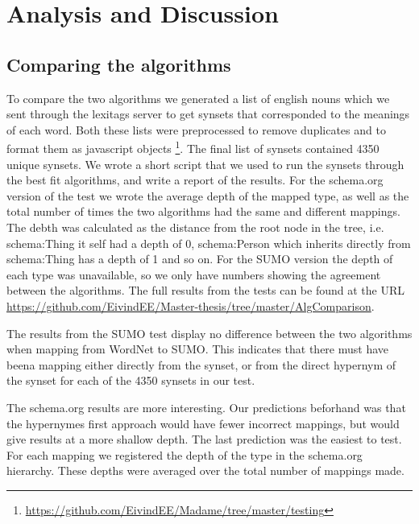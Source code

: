 
\chapter{Analysis and Discussion} %

\label{AnalysisAndDiscussion}


\section{Comparing the algorithms}
\label{ComparingAlgorithms}
To compare the two algorithms we generated a list of english nouns
which we sent through the lexitags server to get synsets that corresponded to the meanings of each word.
Both these lists were preprocessed to remove duplicates and to format them as javascript objects
\footnote{\url{https://github.com/EivindEE/Madame/tree/master/testing}}.
The final list of synsets contained 4350 unique synsets.
We wrote a short script that we used to run the synsets through the best fit algorithms,
and write a report of the results.
For the schema.org version of the test we wrote the average depth of the mapped type,
as well as the total number of times the two algorithms had the same and different mappings.
The debth was calculated as the distance from the root node in the tree,
i.e. schema:Thing it self had a depth of 0,
schema:Person which inherits directly from schema:Thing has a depth of 1 and so on.
For the SUMO version the depth of each type was unavailable,
so we only have numbers showing the agreement between the algorithms.
The full results from the tests can be found at the URL \url{https://github.com/EivindEE/Master-thesis/tree/master/AlgComparison}.

The results from the SUMO test display no difference between the two algorithms when mapping from WordNet to SUMO.
This indicates that there must have beena mapping either directly from the synset,
or from the direct hypernym of the synset for each of the 4350 synsets in our test.

The schema.org results are more interesting.
Our predictions beforhand was that the hypernymes first approach would have fewer incorrect mappings,
but would give results at a more shallow depth.
The last prediction was the easiest to test.
For each mapping we registered the depth of the type in the schema.org hierarchy.
These depths were averaged over the total number of mappings made.

